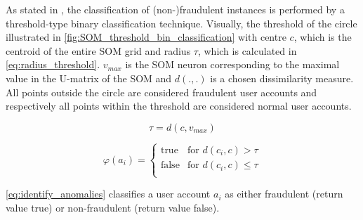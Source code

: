 As stated in \cite{fd_SOM}, the classification of (non-)fraudulent instances is performed by a threshold-type binary classification technique. 
Visually, the threshold of the circle illustrated in \autoref{fig:SOM_threshold_bin_classification} with centre $c$, which is the centroid of the entire \ac{SOM} grid and radius $\tau$, which is calculated in \eqref{eq:radius_threshold}.
$v_{max}$ is the \ac{SOM} neuron corresponding to the maximal value in the U-matrix of the \ac{SOM} and $d(.,.)$ is a chosen dissimilarity measure.
All points outside the circle are considered fraudulent user accounts and respectively all points within the threshold are considered normal user accounts.
%
\begin{ceqn}
    \begin{equation}
    \label{eq:radius_threshold}
        \tau = d(c, v_{max})
    \end{equation}
\end{ceqn}
%
\begin{ceqn}
    \begin{equation}
    \label{eq:identify_anomalies}
        \varphi(a_i) = 
        \begin{cases}
          \text{true} & \text{for } d(c_i, c) > \tau\\
          \text{false} & \text{for } d(c_i, c) \le \tau\\
        \end{cases}   
    \end{equation}
\end{ceqn}
%
\eqref{eq:identify_anomalies} classifies a user account $a_i$ as either fraudulent (return value true) or non-fraudulent (return value false).